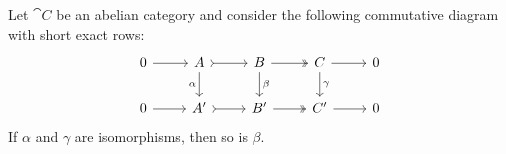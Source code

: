 \begin{lemma}
    \label{lem:abelian-cat-middle-iso-if-lateral-are-iso}
    Let \(\cat C\) be an abelian category and consider the following commutative
    diagram with short exact rows:
    \[
        \begin{tikzcd}
            0 \ar[r]
            &A \ar[r, tail] \ar[d, "\alpha"']
            &B \ar[r, two heads] \ar[d, "\beta"]
            &C \ar[r] \ar[d, "\gamma"]
            &0
            \\
            0 \ar[r]
            &A' \ar[r, tail]
            &B' \ar[r, two heads]
            &C' \ar[r]
            &0
        \end{tikzcd}
    \]
    If \(\alpha\) and \(\gamma\) are isomorphisms, then so is \(\beta\).
\end{lemma}

